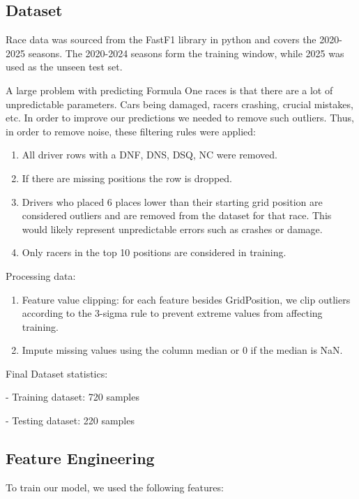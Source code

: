 \documentclass{article}
\begin{document}
\subsection{Dataset}

Race data was sourced from the FastF1 library in python and covers the 2020-2025 seasons. The 2020-2024 seasons form the training window, while 2025 was used as the unseen test set.

A large problem with predicting Formula One races is that there are a lot of unpredictable parameters. Cars being damaged, racers crashing, crucial mistakes, etc. In order to improve our predictions we needed to remove such outliers. Thus, in order to remove noise, these filtering rules were applied:

\begin{enumerate}
    \item All driver rows with a DNF, DNS, DSQ, NC were removed.
    \item If there are missing positions the row is dropped.
    \item Drivers who placed 6 places lower than their starting grid position are considered outliers and are removed from the dataset for that race. This would likely represent unpredictable errors such as crashes or damage.
    \item Only racers in the top 10 positions are considered in training.
\end{enumerate}

Processing data:

\begin{enumerate}
    \item Feature value clipping: for each feature besides GridPosition, we clip outliers according to the 3-sigma rule to prevent extreme values from affecting training.
    \item Impute missing values using the column median or 0 if the median is NaN.
\end{enumerate}

Final Dataset statistics:

- Training dataset: 720 samples

- Testing dataset: 220 samples

\subsection{Feature Engineering}

To train our model, we used the following features:
\end{document}
